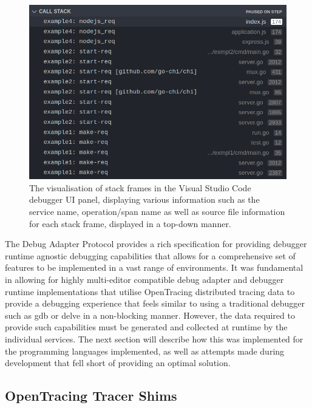 \documentclass[12pt,pdftex,titlepage]{report}
\begin{document}
                \begin{figure}[htb!]
                    \centering
                    \includegraphics[scale=1.7]{vscodestack.png}
                    \caption{The visualisation of stack frames in the Visual Studio Code debugger UI panel, displaying various information such as the service name, operation/span
                    name as well as source file information for each stack frame, displayed in a top-down manner.}
                    \label{fig:stacks}
                \end{figure}

                \newpage
                The Debug Adapter Protocol provides a rich specification for providing debugger runtime agnostic debugging capabilities that allows for a comprehensive set of features to be implemented in a vast range of environments.
                It was fundamental in allowing for highly multi-editor compatible debug adapter and debugger runtime implementations that utilise OpenTracing distributed tracing data to provide a debugging experience that feels similar
                to using a traditional debugger such as gdb or delve in a non-blocking manner. However, the data required to provide such capabilities must be generated and collected at runtime by the individual services. The next section
                will describe how this was implemented for the programming languages implemented, as well as attempts made during development that fell short of providing an optimal solution.


            \subsection{OpenTracing Tracer Shims}
\end{document}
